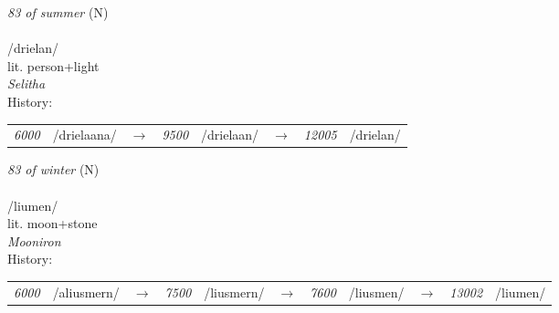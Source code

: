 \vspace{15pt}
\begin{nopagebreak}
 \textit{83 of summer} (N)\\
\\
\noindent /dri{\textprimstress}elan/\\
\noindent lit. person+light\\
\noindent \textit{Selitha}\\


\noindent History:

\vspace{-0pt}
\hspace{40pt}
\begin{tabular}{ccc}
\textit{6000} & /drielaana/&$\rightarrow$ & \textit{9500} & /drielaan/&$\rightarrow$ & \textit{12005} & /drielan/& \\
\end{tabular}

\vspace{20pt}\hline

\end{nopagebreak}
\filbreak



\vspace{15pt}
\begin{nopagebreak}
 \textit{83 of winter} (N)\\
\\
\noindent /li{\textprimstress}umen/\\
\noindent lit. moon+stone\\
\noindent \textit{Mooniron}\\


\noindent History:

\vspace{-0pt}
\hspace{40pt}
\begin{tabular}{ccc}
\textit{6000} & /aliusmern/&$\rightarrow$ & \textit{7500} & /liusmern/&$\rightarrow$ & \textit{7600} & /liusmen/&$\rightarrow$ & \textit{13002} & /liumen/& \\
\end{tabular}

\vspace{20pt}\hline

\end{nopagebreak}
\filbreak



